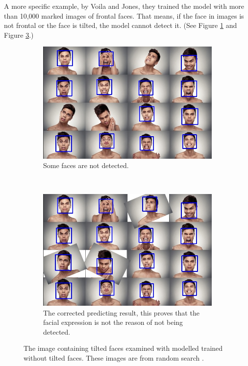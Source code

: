 \documentclass[10pt,twocolumn,letterpaper]{article}
\begin{document}
A more specific example, by Voila and Jones, they trained the model with more than 10,000 marked images of frontal faces.
That means, if the face in images is not frontal or the face is tilted, the model cannot detect it. (See Figure \ref{fig:tilt} and Figure \ref{fig:tiltcor}.)

\begin{figure}[t]
    \centering
    \begin{subfigure}[t]{0.45\textwidth}
        \begin{center}
            \includegraphics[width=0.9\linewidth]{facial1}
        \end{center}
        \caption{Some faces are not detected.}
        \label{fig:tilt}
    \end{subfigure}
	~
    \begin{subfigure}[t]{0.45\textwidth}
        \begin{center}
            \includegraphics[width=0.9\linewidth]{facial1_corrected}
        \end{center}
        \caption{The corrected predicting result, this proves that the facial expression is not the reason of not being detected.}
        \label{fig:tiltcor}
    \end{subfigure}
    \caption{The image containing tilted faces examined with modelled trained without tilted faces. These images are from random search \cite{facialimg}.}
\end{figure}
\end{document}
